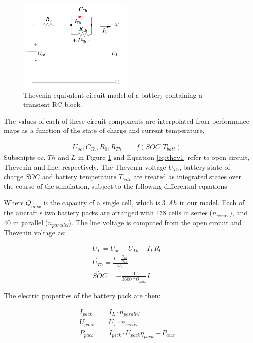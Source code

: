 \documentclass[]{aiaa-tc}%
\begin{document}
\begin{figure}[!htb]%
	\centering
	\includegraphics[width=0.5\textwidth]{figures/thevenin.png}
	\caption{Thevenin equivalent circuit model of a battery containing a transient RC block.}
	\label{fig:thevenin}
\end{figure}

The values of each of these circuit components are interpolated from performance maps as a function of the state of charge and current temperature,

\begin{align}
U_{oc},C_{Th},R_0,R_{Th} &= f(SOC, T_{batt}) \label{eq:thev1}
\end{align}
%
Subscripts $oc$, $Th$ and $L$ in Figure \ref{fig:thevenin} and Equation \ref{eq:thev1} refer to open circuit, Thevenin and line, respectively. The Thevenin voltage $U_{Th}$, battery state of charge $SOC$ and battery temperature $T_{batt}$ are treated as integrated states over the course of the simulation, subject to the following differential equations \cite{Hongwen}:



Where $Q_{max}$ is the capacity of a single cell, which is 3 $Ah$ in our model.  Each of the aircraft's two battery packs are arranged with 128 cells in series ($n_{series}$), and 40 in parallel ($n_{parallel}$).  The line voltage is computed from the open circuit and Thevenin voltage as:

\begin{align}
U_L = U_{oc} - U_{Th} - I_L R_0 \label{eq:U_L} \\
\dot{U_{Th}} = \frac{I-\frac{U_{Th}}{R_{Th}}}{C_1}\\
\dot{SOC} = -\frac{1}{3600*Q_{max}}I
\end{align}

The electric properties of the battery pack are then:

\begin{align}
I_{pack} &= I_L \cdot n_{parallel} \label{eq:I_pack} \\
U_{pack} &= U_L \cdot n_{series} \label{eq:U_pack} \\
P_{pack} &= I_{pack} \cdot U_{pack} \eta_{pack} - P_{aux} \label{eq:P_pack}
\end{align}
\end{document}
